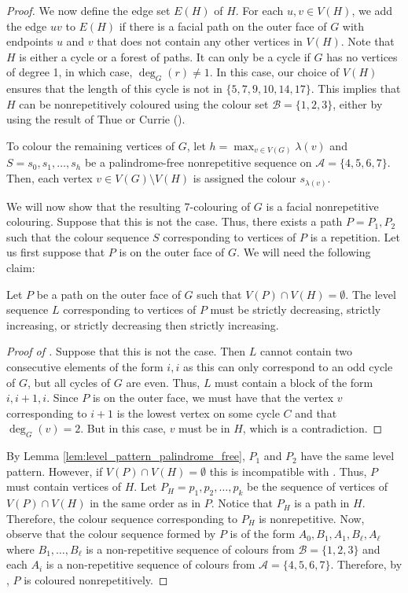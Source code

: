 \documentclass{patmorin}
\begin{document}
\begin{proof}
We now define the edge set $E(H)$ of $H$.  For each $u,v\in V(H)$,
we add the edge $uv$ to $E(H)$ if there is a facial path on the outer
face of $G$ with endpoints $u$ and $v$ that does not contain any other
vertices in $V(H)$.  Note that $H$ is either a cycle or a forest of
paths. It can only be a cycle if $G$ has no vertices of degree 1,
in which case, $\deg_G(r)\neq 1$.  In this case, our choice of $V(H)$
ensures that the length of this cycle is not in  $\{5,7,9,10,14,17\}$.
This implies that $H$ can be nonrepetitively coloured using the colour set
$\mathcal{B}=\{1,2,3\}$, either by using the result of Thue \cite{thue1906uber}
or Currie ().

To colour the remaining vertices of $G$, let $h=\max_{v \in V(G)}
\lambda(v)$ and $S=s_0,s_1,\ldots,s_h$ be a palindrome-free nonrepetitive
sequence on $\mathcal{A}=\{4,5,6,7\}$.  Then, each vertex $v\in
V(G)\setminus V(H)$ is assigned the colour $s_{\lambda(v)}$.

We will now show that the resulting 7-colouring of $G$ is a facial
nonrepetitive colouring. Suppose that this is not the case. Thus,
there exists a path $P=P_1,P_2$ such that the colour sequence $S$
corresponding to vertices of $P$ is a repetition. Let us first suppose
that $P$ is on the outer face of $G$. We will need the following claim:

 \begin{clm}
  Let $P$ be a path on the outer face of $G$ such that $V(P) \cap V(H) = \emptyset$. The level sequence $L$ corresponding to vertices of $P$ must be strictly decreasing, strictly increasing, or strictly decreasing then strictly increasing.
 \end{clm}
 \begin{proof}[Proof of ]
 Suppose that this is not the case. Then $L$ cannot contain two
 consecutive elements of the form $i,i$ as this can only correspond to
 an odd cycle of $G$, but all cycles of $G$ are even. Thus, $L$ must
 contain a block of the form $i,i+1,i$. Since $P$ is on the outer face,
 we must have that the vertex $v$ corresponding to $i+1$ is the lowest
 vertex on some cycle $C$ and that $\deg_G(v)=2$. But in this case, $v$
 must be in $H$, which is a contradiction.
 \end{proof}
 By Lemma \ref{lem:level_pattern_palindrome_free}, $P_1$ and $P_2$ have
 the same level pattern. However, if $V(P) \cap V(H) = \emptyset$ this
 is incompatible with .  Thus, $P$ must contain
 vertices of $H$. Let $P_H=p_1,p_2,\ldots,p_k$ be the sequence of vertices
 of $V(P) \cap V(H)$ in the same order as in $P$. Notice that $P_H$ is
 a path in $H$.  Therefore, the colour sequence corresponding to $P_H$
 is nonrepetitive.  Now, observe that the colour sequence formed by $P$
 is of the form $A_0,B_1,A_1,B_\ell,A_\ell$ where $B_1,\ldots,B_\ell$
 is a non-repetitive sequence of colours from $\mathcal{B}=\{1,2,3\}$ and
 each $A_i$ is a non-repetitive sequence of colours from $\mathcal{A}=\{4,5,6,7\}$.
 Therefore, by , $P$ is coloured nonrepetitively.


\end{proof}
\end{document}
